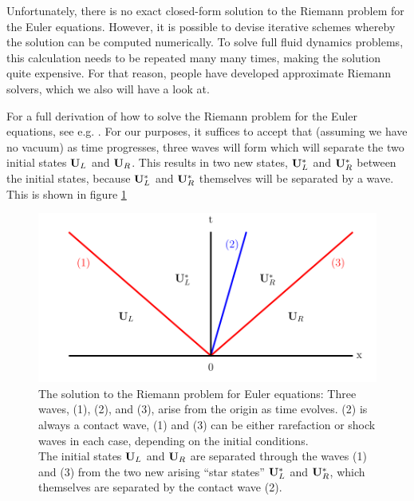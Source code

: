 Unfortunately, there is no exact closed-form solution to the Riemann problem for the Euler equations.
However, it is possible to devise iterative schemes whereby the solution can be computed numerically.
To solve full fluid dynamics problems, this calculation needs to be repeated many many times, making the solution quite expensive.
For that reason, people have developed approximate Riemann solvers, which we also will have a look at.



For a full derivation of how to solve the Riemann problem for the Euler equations, see e.g. \cite{toro}.
For our purposes, it suffices to accept that (assuming we have no vacuum) as time progresses, three waves will form which will separate the two initial states $\mathbf{U}_L$ and $\mathbf{U}_R$.
This results in two new states, $\mathbf{U}_L^*$ and $\mathbf{U}_R^*$ between the initial states, because  $\mathbf{U}_L^*$ and $\mathbf{U}_R^*$ themselves will be separated by a wave.
This is shown in figure \ref{fig:riemann-solution}


\begin{figure}[H]
	\includegraphics{./figures/riemann_solution.pdf}%
	\caption{
		The solution to the Riemann problem for Euler equations: 
		Three waves, (1), (2), and (3), arise from the origin as time evolves.
		(2) is always a contact wave, (1) and (3) can be either rarefaction or shock waves in each case, depending on the initial conditions.\\
		The initial states $\mathbf{U}_L$ and $\mathbf{U}_R$ are separated through the waves (1) and (3) from the two new arising ``star states'' $\mathbf{U}_L^*$ and $\mathbf{U}_R^*$, which themselves are separated by the contact wave (2).
		\label{fig:riemann-solution}
	}
\end{figure}












